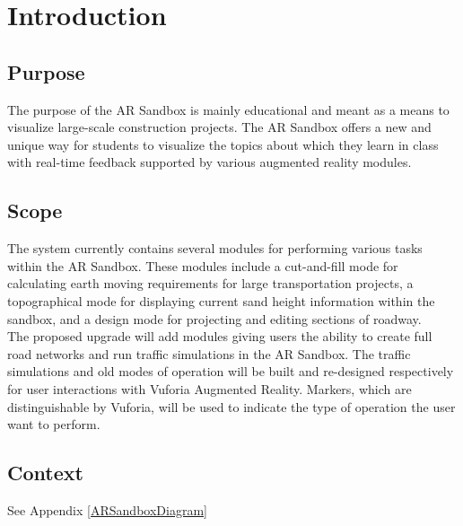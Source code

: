 \documentclass[letterpaper, 10pt, onecolumn, draftclsnofoot]{IEEEtran}
\begin{document}
\section{Introduction}
    \subsection{Purpose}
        The purpose of the AR Sandbox is mainly educational and meant as a means to visualize large-scale construction projects. The AR Sandbox offers a new and unique way for students to visualize the topics about which they learn in class with real-time feedback supported by various augmented reality modules.
        
    \subsection{Scope}
        The system currently contains several modules for performing various tasks within the AR Sandbox. These modules include a cut-and-fill mode for calculating earth moving requirements for large transportation projects, a topographical mode for displaying current sand height information within the sandbox, and a design mode for projecting and editing sections of roadway.\\
        The proposed upgrade will add modules giving users the ability to create full road networks and run traffic simulations in the AR Sandbox. The traffic simulations and old modes of operation will be built and re-designed respectively for user interactions with Vuforia Augmented Reality. Markers, which are distinguishable by Vuforia, will be used to indicate the type of operation the user want to perform.
        
    \subsection{Context}
    \begin{center}
        See Appendix \ref{ARSandboxDiagram}
    \end{center}
\end{document}
